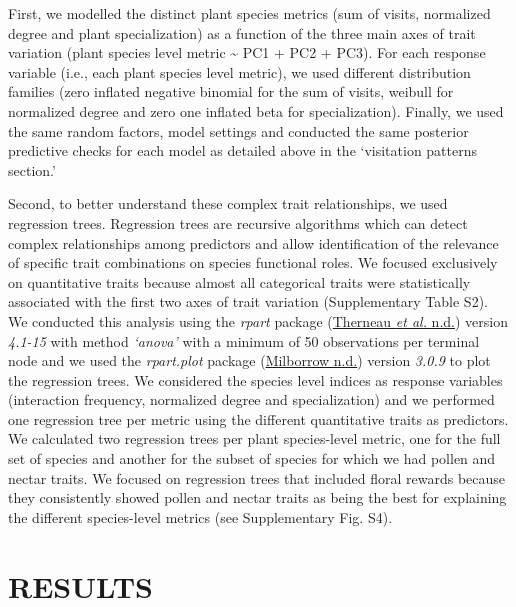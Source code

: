 \documentclass[
  12pt,
  a4paper,
]{article}
\begin{document}
First, we modelled the distinct plant species metrics (sum of visits, normalized degree and plant specialization) as a function of the three main axes of trait variation (plant species level metric \textasciitilde{} PC1 + PC2 + PC3). For each response variable (i.e., each plant species level metric), we used different distribution families (zero inflated negative binomial for the sum of visits, weibull for normalized degree and zero one inflated beta for specialization). Finally, we used the same random factors, model settings and conducted the same posterior predictive checks for each model as detailed above in the `visitation patterns section.'

Second, to better understand these complex trait relationships, we used regression trees. Regression trees are recursive algorithms which can detect complex relationships among predictors and allow identification of the relevance of specific trait combinations on species functional roles. We focused exclusively on quantitative traits because almost all categorical traits were statistically associated with the first two axes of trait variation (Supplementary Table S2). We conducted this analysis using the \emph{rpart} package (\protect\hyperlink{ref-therneau2015}{Therneau \emph{et al.} n.d.}) version \emph{4.1-15} with method \emph{`anova'} with a minimum of 50 observations per terminal node and we used the \emph{rpart.plot} package (\protect\hyperlink{ref-milborrow2015}{Milborrow n.d.}) version \emph{3.0.9} to plot the regression trees. We considered the species level indices as response variables (interaction frequency, normalized degree and specialization) and we performed one regression tree per metric using the different quantitative traits as predictors. We calculated two regression trees per plant species-level metric, one for the full set of species and another for the subset of species for which we had pollen and nectar traits. We focused on regression trees that included floral rewards because they consistently showed pollen and nectar traits as being the best for explaining the different species-level metrics (see Supplementary Fig. S4).

\hypertarget{results}{%
\section{RESULTS}\label{results}}
\end{document}
